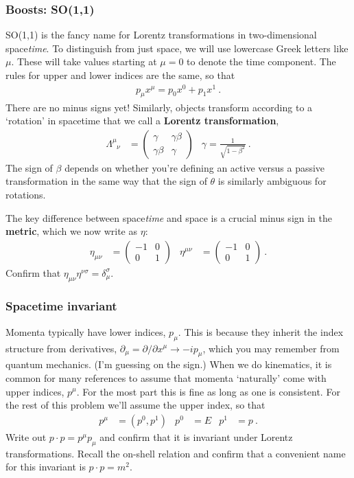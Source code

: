 \documentclass[12pt]{article}
\begin{document}
\subsubsection{Boosts: SO(1,1)}

SO(1,1) is the fancy name for Lorentz transformations in two-dimensional space\emph{time}. To distinguish from just space, we will use lowercase Greek letters like $\mu$. These will take values starting at $\mu = 0$ to denote the time component. The rules for upper and lower indices are the same, so that 
\begin{align}
	p_\mu x^\mu = p_0 x^0 + p_1 x^1 \ .
\end{align}
There are no minus signs yet! Similarly, objects transform according to a `rotation' in spacetime that we call a \textbf{Lorentz transformation},
\begin{align}
	\Lambda^\mu_{\phantom \mu \nu} &= 
	\begin{pmatrix}
		\gamma & \gamma \beta
		\\
		\gamma \beta & \gamma
	\end{pmatrix}
	&
	\gamma = \frac{1}{\sqrt{1-\beta^2}} \ .
	\label{eq:boost}
\end{align}
The sign of $\beta$ depends on whether you're defining an active versus a passive transformation in the same way that the sign of $\theta$ is similarly ambiguous for rotations.

The key difference between space\emph{time} and space is a crucial minus sign in the \textbf{metric}, which we now write as $\eta$:
\begin{align}
	\eta_{\mu\nu} &= \begin{pmatrix}
		-1 & 0 \\
		0 & 1
	\end{pmatrix}
	&
	\eta^{\mu\nu} &= \begin{pmatrix}
		-1 & 0 \\
		0 & 1
	\end{pmatrix} \ .
\end{align}
Confirm that $\eta_{\mu\nu} \eta^{\nu\sigma} = \delta^\sigma_\mu$.


\subsubsection{Spacetime invariant}

Momenta typically have lower indices, $p_\mu$. This is because they inherit the index structure from derivatives, $\partial_\mu = \partial/\partial x^\mu \to -i p_\mu $, which you may remember from quantum mechanics. (I'm guessing on the sign.) When we do kinematics, it is common for many references to assume that momenta `naturally' come with upper indices, $p^\mu$. For the most part this is fine as long as one is consistent. For the rest of this problem we'll assume the upper index, so that
\begin{align}
	p^\mu &= (p^0, p^1) 
	&
	p^0 &= E 
	&
	p^1 &= p \ .
\end{align}
Write out $p\cdot p = p^\mu p_\mu$ and confirm that it is invariant under Lorentz transformations. Recall the on-shell relation and confirm that a convenient name for this invariant is $p\cdot p = m^2$.
\end{document}
